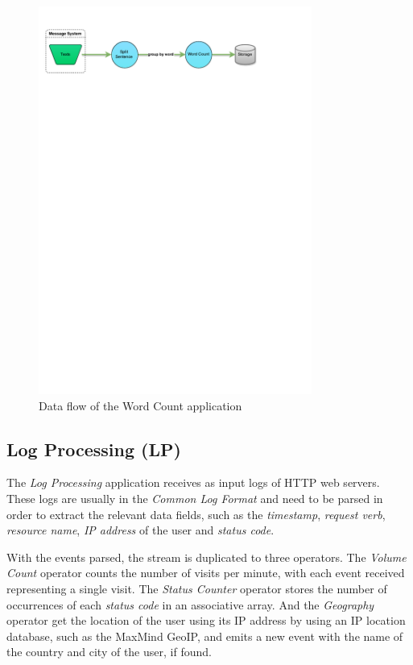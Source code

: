 \documentclass[ppgc,diss,english]{iiufrgs}
\begin{document}
\begin{figure}[!ht]
	\centering
	\includegraphics[width=0.8\textwidth]{images/apps/WordCount.pdf}
	\caption{Data flow of the Word Count application}
	\label{fig:app_wordcount}
\end{figure}

\subsection{Log Processing (LP)}

The \emph{Log Processing} application receives as input logs of HTTP web servers. These logs are usually in the \emph{Common Log Format} and need to be parsed in order to extract the relevant data fields, such as the \emph{timestamp}, \emph{request verb}, \emph{resource name}, \emph{IP address} of the user and \emph{status code}.

With the events parsed, the stream is duplicated to three operators. The \emph{Volume Count} operator counts the number of visits per minute, with each event received representing a single visit. The \emph{Status Counter} operator stores the number of occurrences of each \emph{status code} in an associative array. And the \emph{Geography} operator get the location of the user using its IP address by using an IP location database, such as the MaxMind GeoIP, and emits a new event with the name of the country and city of the user, if found.
\end{document}
